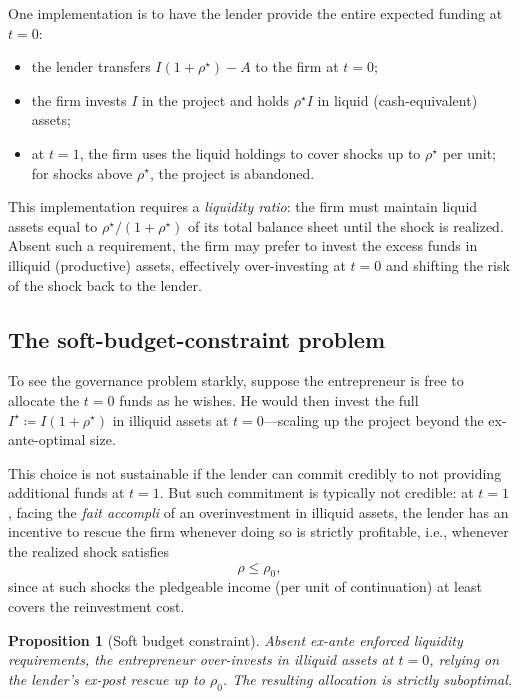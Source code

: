 \documentclass[11pt,a4paper,oneside]{book}
\def\leq{\leqslant}
\theoremstyle{plain}
\newtheorem{proposition}[theorem]{Proposition}
\theoremstyle{definition}
\theoremstyle{remark}
\numberwithin{equation}{chapter}
\begin{document}
One implementation is to have the lender provide the entire expected funding at $t=0$:
\begin{itemize}
  \item the lender transfers $I(1 + \rho^\star) - A$ to the firm at $t=0$;
  \item the firm invests $I$ in the project and holds $\rho^\star I$ in liquid (cash-equivalent) assets;
  \item at $t=1$, the firm uses the liquid holdings to cover shocks up to $\rho^\star$ per unit; for shocks above $\rho^\star$, the project is abandoned.
\end{itemize}
This implementation requires a \emph{liquidity ratio}: the firm must maintain liquid assets equal to $\rho^\star/(1 + \rho^\star)$ of its total balance sheet until the shock is realized.
Absent such a requirement, the firm may prefer to invest the excess funds in illiquid (productive) assets, effectively over-investing at $t=0$ and shifting the risk of the shock back to the lender.

\subsection{The soft-budget-constraint problem}

To see the governance problem starkly, suppose the entrepreneur is free to allocate the $t=0$ funds as he wishes.
He would then invest the full $I^\star \coloneqq I(1 + \rho^\star)$ in illiquid assets at $t=0$---scaling up the project beyond the ex-ante-optimal size.

This choice is not sustainable if the lender can commit credibly to not providing additional funds at $t=1$.
But such commitment is typically not credible: at $t=1$, facing the \emph{fait accompli} of an overinvestment in illiquid assets, the lender has an incentive to rescue the firm whenever doing so is strictly profitable, i.e., whenever the realized shock satisfies
\begin{equation*}
  \rho \leq \rho_0,
\end{equation*}
since at such shocks the pledgeable income (per unit of continuation) at least covers the reinvestment cost.

\begin{proposition}[Soft budget constraint]\label{prop:LS-soft-budget}
Absent ex-ante enforced liquidity requirements, the entrepreneur over-invests in illiquid assets at $t=0$, relying on the lender's ex-post rescue up to $\rho_0$.
The resulting allocation is strictly suboptimal.
\end{proposition}
\end{document}
